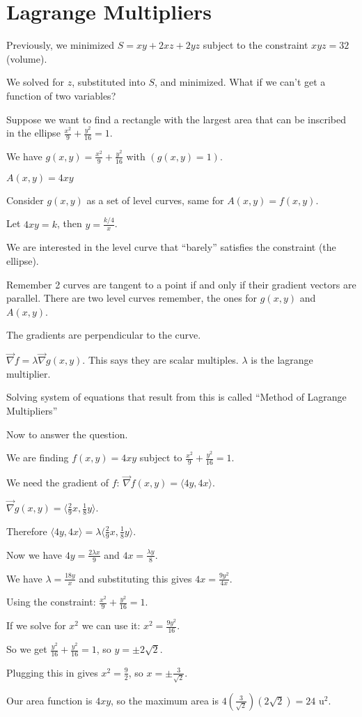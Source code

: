 \documentclass[../calc3.tex]{subfiles}
\begin{document}
\section{Lagrange Multipliers}
Previously, we minimized $S=xy+2xz+2yz$ subject to the constraint $xyz=32$ (volume).

We solved for $z$, substituted into $S$, and minimized. What if we can't get a function of two variables?

\pagebreak
\begin{example}
    Suppose we want to find a rectangle with the largest area that can be inscribed in the ellipse $\frac{x^2}{9}+\frac{y^2}{16}=1$.

    We have $g(x,y)=\frac{x^2}{9}+\frac{y^2}{16}$ with $(g(x,y)=1)$.

    $A(x,y)=4xy$

    Consider $g(x,y)$ as a set of level curves, same for $A(x,y)=f(x,y)$.

    Let $4xy=k$, then $y=\frac{k/4}{x}$.

    We are interested in the level curve that ``barely'' satisfies the constraint (the ellipse).

    Remember 2 curves are tangent to a point if and only if their gradient vectors are parallel. There are two level curves remember, the ones for $g(x,y)$ and $A(x,y)$.

    The gradients are perpendicular to the curve.

    $\vec{\nabla}f=\lambda \vec{\nabla}g(x,y)$. This says they are scalar multiples. $\lambda$ is the lagrange multiplier.

    Solving system of equations that result from this is called ``Method of Lagrange Multipliers''

    Now to answer the question.

    We are finding $f(x,y)=4xy$ subject to $\frac{x^2}{9}+\frac{y^2}{16}=1$.

    We need the gradient of $f$: $\vec{\nabla}f(x,y)=\langle 4y,4x\rangle$.

    $\vec{\nabla}g(x,y)=\langle \frac{2}{9}x,\frac{1}{8}y\rangle$.

    Therefore $\langle 4y,4x\rangle = \lambda \langle \frac{2}{9}x,\frac{1}{8}y\rangle$.

    Now we have $4y=\frac{2\lambda x}{9}$ and $4x=\frac{\lambda y}{8}$.

    We have $\lambda = \frac{18y}{x}$ and substituting this gives $4x=\frac{9y^2}{4x}$.

    Using the constraint: $\frac{x^2}{9}+\frac{y^2}{16}=1$.

    If we solve for $x^2$ we can use it: $x^2=\frac{9y^2}{16}$.

    So we get $\frac{y^2}{16}+\frac{y^2}{16}=1$, so $y=\pm 2\sqrt{2}$.

    Plugging this in gives $x^2=\frac{9}{2}$, so $x=\pm \frac{3}{\sqrt{2}}$.

    Our area function is $4xy$, so the maximum area is $4\left(\frac{3}{\sqrt{2}}\right)(2\sqrt{2})=24$ u$^2$.
\end{example}
\end{document}

